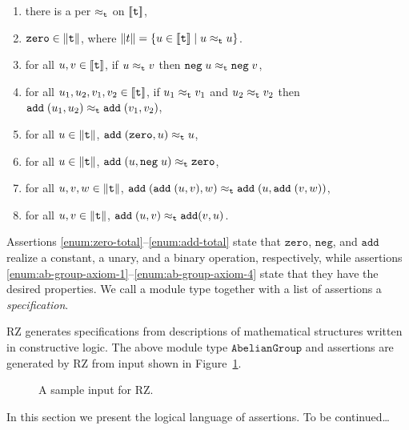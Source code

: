 \begin{enumerate}
\item there is a per $\approx_{\mathtt{t}}$ on $[\![\mathtt{t}]\!]$,
\item
  \label{enum:zero-total}%
  $\mathtt{zero} \in \|\mathtt{t}\|$, where $\|t\| =
  \{u \in [\![\mathtt{t}]\!] \mid u \approx_{\mathtt{t}} u\}$.
\item
  \label{enum:neg-total}%
  for all $u, v \in [\![\mathtt{t}]\!]$, if $u \approx_{\mathtt{t}} v$ then
  $\mathtt{neg} \; u \approx_{\mathtt{t}} \mathtt{neg} \; v$,
\item
  \label{enum:add-total}%
  for all $u_1, u_2, v_1, v_2 \in [\![\mathtt{t}]\!]$, if $u_1
  \approx_{\mathtt{t}} v_1$ and $u_2 \approx_{\mathtt{t}} v_2$ then $\mathtt{add} \; (u_1,
  u_2) \approx_{\mathtt{t}} \mathtt{add} \; (v_1, v_2)$,
\item 
  \label{enum:ab-group-axiom-1}%
  for all $u \in \|\mathtt{t}\|$, $\mathtt{add} \;
  (\mathtt{zero}, u) \approx_{\mathtt{t}} u$,
\item
  \label{enum:ab-group-axiom-2}%
  for all $u \in \|\mathtt{t}\|$, $\mathtt{add} \; (u,
  \mathtt{neg} \; u) \approx_{\mathtt{t}} \mathtt{zero}$,
\item
  \label{enum:ab-group-axiom-3}%
  for all $u, v, w \in \|\mathtt{t}\|$, $\mathtt{add} \;
  (\mathtt{add} \; (u, v), w) \approx_{\mathtt{t}} \mathtt{add} \; (u,
  \mathtt{add} \; (v, w))$,
\item
  \label{enum:ab-group-axiom-4}%
  for all $u, v \in \|\mathtt{t}\|$, $\mathtt{add} \; (u, v)
  \approx_{\mathtt{t}} \mathtt{add} (v, u)$.
\end{enumerate}
%
Assertions \ref{enum:zero-total}--\ref{enum:add-total} state that
$\mathtt{zero}$, $\mathtt{neg}$, and $\mathtt{add}$ realize a
constant, a unary, and a binary operation, respectively, while
assertions \ref{enum:ab-group-axiom-1}--\ref{enum:ab-group-axiom-4}
state that they have the desired properties. We call a module type
together with a list of assertions a \emph{specification}.

RZ generates specifications from descriptions of mathematical
structures written in constructive logic. The above module type
$\mathtt{AbelianGroup}$ and assertions are generated by RZ from input
shown in Figure~\ref{fig:ab-group-thy}.
%
\begin{figure}
  \centering
  \caption{A sample input for RZ.}
  \label{fig:ab-group-thy}
\end{figure}


In this section we present the logical language of assertions. To be
continued\dots




